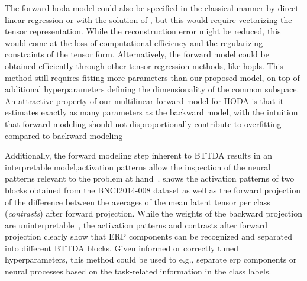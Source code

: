 \documentclass[twocolumn]{article}
\begin{document}
	The forward \ac{hoda} model could also be specified in the
	classical manner by direct linear regression or with the solution of \textcite{Haufe2014}, but this would require
	vectorizing the tensor representation.
	While the reconstruction error might be reduced, this would come at the loss of computational
	efficiency and the regularizing constraints of the tensor form.
	Alternatively, the forward model could be obtained efficiently through other tensor
	regression methods, like \ac{hopls}. This method still requires fitting more parameters than our
	proposed model, on top of additional hyperparameters defining the
	dimensionality of the common subspace.
	An attractive property of our multilinear forward model for HODA is that it
	estimates exactly as many parameters as the backward model, with the intuition that
	forward modeling should not disproportionally contribute to overfitting compared
	to backward modeling

	Additionally, the forward modeling step inherent to BTTDA results
	in an interpretable model,activation patterns allow the inspection of the
	neural patterns relevant to the problem at hand~\cite{Haufe2014}.
	shows the activation patterns
	of two blocks obtained from the BNCI2014-008 dataset as well as the forward
	projection of the difference between the averages of the mean latent tensor per
	class (\emph{contrasts}) after forward projection.
	While the weights of the backward projection are
	uninterpretable~\cite{Haufe2014},
	the activation patterns and contrasts after forward projection clearly show
	that ERP components can be recognized and separated into different
	BTTDA blocks.
	Given informed or correctly tuned hyperparameters, this method could be used to
	e.g., separate \ac{erp} components or neural processes based on the task-related
	information in the class labels.
\end{document}
